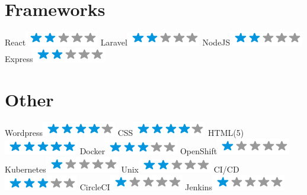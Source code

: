 \begin{aside}
    \section{Frameworks}
      React\includegraphics[scale=0.40]{img/2stars.png}
      Laravel\includegraphics[scale=0.40]{img/2stars.png}
      NodeJS\includegraphics[scale=0.40]{img/2stars.png}
      Express\includegraphics[scale=0.40]{img/2stars.png}
    \section{Other}
      Wordpress\includegraphics[scale=0.40]{img/4stars.png}
      CSS\includegraphics[scale=0.40]{img/4stars.png}
      HTML(5)\includegraphics[scale=0.40]{img/5stars.png}
      Docker\includegraphics[scale=0.40]{img/3stars.png}
      OpenShift\includegraphics[scale=0.40]{img/1stars.png}
      Kubernetes\includegraphics[scale=0.40]{img/1stars.png}
      Unix\includegraphics[scale=0.40]{img/2stars.png}
      CI/CD\includegraphics[scale=0.40]{img/3stars.png}
      CircleCI\includegraphics[scale=0.40]{img/1stars.png}
      Jenkins\includegraphics[scale=0.40]{img/1stars.png}
  \end{aside}
